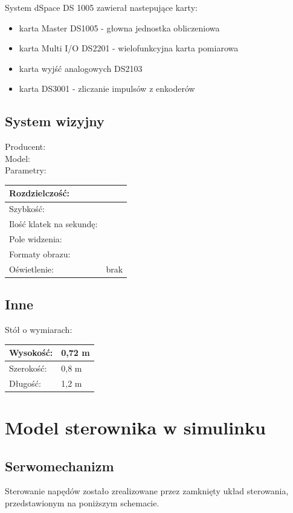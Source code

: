 System dSpace DS 1005 zawierał nastepujące karty:
\begin{itemize}
\item karta Master DS1005 - głowna jednostka obliczeniowa
\item karta Multi I/O DS2201 - wielofunkcyjna karta pomiarowa
\item karta wyjść analogowych DS2103
\item karta DS3001 - zliczanie impulsów z enkoderów
\end{itemize}

\subsection{System wizyjny}
\noindent Producent:\\
Model:\\
Parametry:\\
\noindent \begin{tabular}{|l|l|} \hline
{Rozdzielczość: }& \\ \hline
{Szybkość: } &\\ \hline
{Ilość klatek na sekundę: }&\\ \hline
{Pole widzenia: }&\\ \hline
{Formaty obrazu: }& \\ \hline
{Oświetlenie: }& {brak} \\ \hline
\end{tabular}
\subsection{Inne}
\noindent Stół o wymiarach:\\
\begin{tabular}{|l|l|}\hline
Wysokość: & 0,72 m\\ \hline
Szerokość: & 0,8 m\\ \hline
Długość: & 1,2 m\\ \hline
\end{tabular}
\newpage
\section{Model sterownika w simulinku}
\label{sec:modelWSimulinku}

\subsection{Serwomechanizm}
\label{subsec:Serwomechanizm}

Sterowanie napędów zostało zrealizowane przez zamknięty układ sterowania, przedstawionym na poniższym schemacie. %

